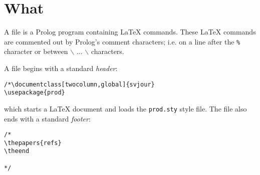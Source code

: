 \section{What}

A {\PROD} file is a Prolog program containing {\LaTeX} commands.
These
{\LaTeX} commands are commented out by Prolog's comment
characters; i.e. on a line after the {\tt \%} character or between
 {$\backslash$}{\tt *} ... {\tt *}{$\backslash$} characters.

A {\PROD} file begins with a standard {\em header}:

{\scriptsize \begin{verbatim}
/*\documentclass[twocolumn,global]{svjour}
\usepackage{prod}
\end{verbatim}}

which starts a {\LaTeX} document and loads the {\tt prod.sty} style file.
The file also ends with a standard {\em footer}:

{\scriptsize \begin{verbatim}
/*
\thepapers{refs}
\theend

*/
\end{verbatim}}

